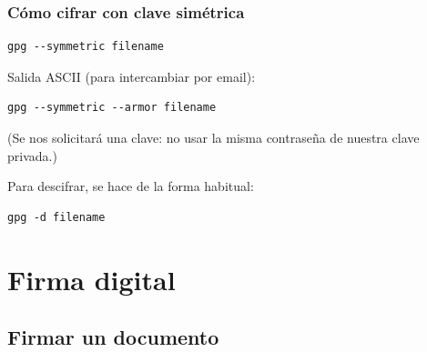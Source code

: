 \documentclass{beamer}
\begin{document}

\begin{frame}[fragile]
\frametitle{Cómo cifrar con clave simétrica}



\begin{lstlisting}[frame=trBL]
gpg --symmetric filename
\end{lstlisting}

\medskip

Salida ASCII (para intercambiar por email):
\begin{lstlisting}[frame=trBL]
gpg --symmetric --armor filename
\end{lstlisting}

{\footnotesize(Se nos solicitará una clave: no usar la misma contraseña de nuestra clave privada.)}

\medskip

Para descifrar, se hace de la forma habitual:
\begin{lstlisting}[frame=trBL]
gpg -d filename
\end{lstlisting}


\end{frame}

\section{Firma digital}

\subsection{Firmar un documento}
\end{document}
